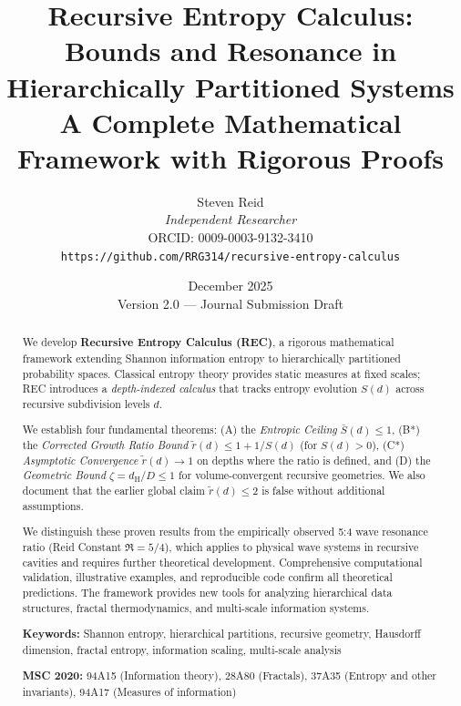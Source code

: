 \documentclass[11pt,a4paper]{article}
\title{%
    \textbf{Recursive Entropy Calculus: \\[0.3em] 
    Bounds and Resonance in Hierarchically Partitioned Systems} \\[1em]
    \large A Complete Mathematical Framework with Rigorous Proofs
}
\author{
    Steven Reid \\[0.5em]
    \textit{Independent Researcher} \\
    ORCID: 0009-0003-9132-3410 \\[0.3em]
    \texttt{https://github.com/RRG314/recursive-entropy-calculus}
}
\date{December 2025 \\ \small Version 2.0 --- Journal Submission Draft}
\theoremstyle{definition}
\theoremstyle{remark}
\newcommand{\dH}{d_{\mathrm{H}}}
\newcommand{\Sbar}{\bar{S}}
\newcommand{\rtilde}{\tilde{r}}
\begin{document}
\maketitle

\begin{abstract}
We develop \textbf{Recursive Entropy Calculus (REC)}, a rigorous mathematical framework extending Shannon information entropy to hierarchically partitioned probability spaces. Classical entropy theory provides static measures at fixed scales; REC introduces a \emph{depth-indexed calculus} that tracks entropy evolution $S(d)$ across recursive subdivision levels $d$. 

We establish four fundamental theorems: (A) the \emph{Entropic Ceiling} $\Sbar(d) \leq 1$, (B*) the \emph{Corrected Growth Ratio Bound} $\rtilde(d) \leq 1 + 1/S(d)$ (for $S(d)>0$), (C*) \emph{Asymptotic Convergence} $\rtilde(d) \to 1$ on depths where the ratio is defined, and (D) the \emph{Geometric Bound} $\zeta = \dH/D \leq 1$ for volume-convergent recursive geometries. We also document that the earlier global claim $\rtilde(d)\le2$ is false without additional assumptions.

We distinguish these proven results from the empirically observed 5:4 wave resonance ratio (Reid Constant $\mathfrak{R} = 5/4$), which applies to physical wave systems in recursive cavities and requires further theoretical development. Comprehensive computational validation, illustrative examples, and reproducible code confirm all theoretical predictions. The framework provides new tools for analyzing hierarchical data structures, fractal thermodynamics, and multi-scale information systems.

\medskip
\noindent\textbf{Keywords:} Shannon entropy, hierarchical partitions, recursive geometry, Hausdorff dimension, fractal entropy, information scaling, multi-scale analysis

\medskip
\noindent\textbf{MSC 2020:} 94A15 (Information theory), 28A80 (Fractals), 37A35 (Entropy and other invariants), 94A17 (Measures of information)
\end{abstract}

\tableofcontents
\newpage

\end{document}
